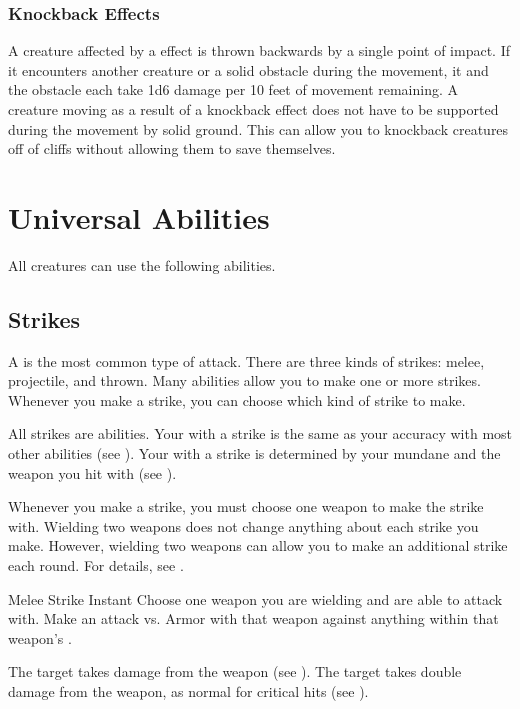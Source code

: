         \subsubsection{Knockback Effects}\label{Knockback Effects}
            A creature affected by a  effect is thrown backwards by a single point of impact.
            If it encounters another creature or a solid obstacle during the movement, it and the obstacle each take 1d6 damage per 10 feet of movement remaining.
            A creature moving as a result of a knockback effect does not have to be supported during the movement by solid ground.
            This can allow you to knockback creatures off of cliffs without allowing them to save themselves.

\section{Universal Abilities}\label{Universal Abilities}
    All creatures can use the following abilities.

    \subsection{Strikes}\label{Strikes}
        A  is the most common type of attack.
        There are three kinds of strikes: melee, projectile, and thrown.
        Many abilities allow you to make one or more strikes.
        Whenever you make a strike, you can choose which kind of strike to make.

        All strikes are  abilities.
        Your  with a strike is the same as your accuracy with most other abilities (see ).
        Your  with a strike is determined by your mundane  and the weapon you hit with (see ).

        Whenever you make a strike, you must choose one weapon to make the strike with.
        Wielding two weapons does not change anything about each strike you make.
        However, wielding two weapons can allow you to make an additional strike each round.
        For details, see .

        \begin{instantability}{Melee Strike}
            \label{Melee Strike}
            Instant
            \rankline
            Choose one  weapon you are wielding and are able to attack with.
            Make an attack vs. Armor with that weapon against anything within that weapon's .

            \hit The target takes damage from the weapon (see ).
            \crit The target takes double damage from the weapon, as normal for critical hits (see ).
        \end{instantability}

